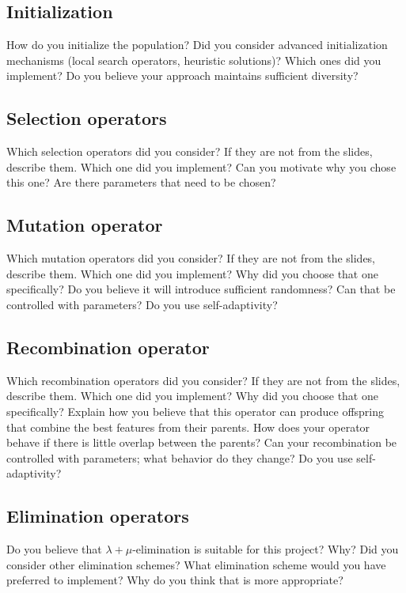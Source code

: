 \documentclass[a4paper,10pt]{article}
\newcommand{\ReplaceMe}[1]{{\color{blue}#1}}
\begin{document}
\subsection{Initialization}

\ReplaceMe{How do you initialize the population? Did you consider advanced initialization mechanisms (local search operators, heuristic solutions)? Which ones did you implement? Do you believe your approach maintains sufficient diversity?}

\subsection{Selection operators}

\ReplaceMe{Which selection operators did you consider? If they are not from the slides, describe them. Which one did you implement? Can you motivate why you chose this one? Are there parameters that need to be chosen?}

\subsection{Mutation operator}

\ReplaceMe{Which mutation operators did you consider? If they are not from the slides, describe them. Which one did you implement? Why did you choose that one specifically? Do you believe it will introduce sufficient randomness? Can that be controlled with parameters? Do you use self-adaptivity?}

\subsection{Recombination operator}

\ReplaceMe{Which recombination operators did you consider? If they are not from the slides, describe them. Which one did you implement? Why did you choose that one specifically? Explain how you believe that this operator can produce offspring that combine the best features from their parents. How does your operator behave if there is little overlap between the parents? Can your recombination be controlled with parameters; what behavior do they change? Do you use self-adaptivity?}

\subsection{Elimination operators}

\ReplaceMe{Do you believe that $\lambda+\mu$-elimination is suitable for this project? Why? Did you consider other elimination schemes? What elimination scheme would you have preferred to implement? Why do you think that is more appropriate?} 
\end{document}
